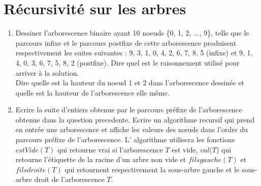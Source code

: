 \documentclass{article}[12pt]
\begin{document}
\section*{Récursivité sur les arbres}
\begin{enumerate}
\item Dessiner l'arborescence binaire ayant 10 noeuds \{0, 1, 2, ..., 9\}, telle que le parcours infixe et le parcours postfixe de cette arborescence produisent respectivement les suites suivantes : 9, 3, 1, 0, 4, 2, 6, 7, 8, 5 (infixe) et 9, 1, 4, 0, 3, 6, 7, 5, 8, 2 (postfixe). Dire quel est le raisonnement utilisé pour arriver à la solution.\\ Dire quelle est la hauteur du noeud 1 et 2 dans l'arborescence dessinée et quelle est la hauteur de l'arborescence elle même. \\

\item Ecrire la suite d'entiers obtenue par le parcours préfixe de l'arborescence obtenue dans la question precedente. Ecrire un algorithme recursif qui prend en entrée une arborescence et affiche les valeurs des n{\oe}uds dans l'ordre du parcours préfixe de l'arborescence. L' algorithme utilisera les fonctions $estVide(T)$ qui retourne vrai si l'arborescence $T$ est vide, $val(T$) qui retourne l'étiquette de la racine
d’un arbre non vide et $filsgauche(T)$ et $filsdroite(T)$ qui retournent respectivement la sous-arbre gauche et le sous-arbre droit de l'arborescence $T$.\\

\end{enumerate}
\end{document}
